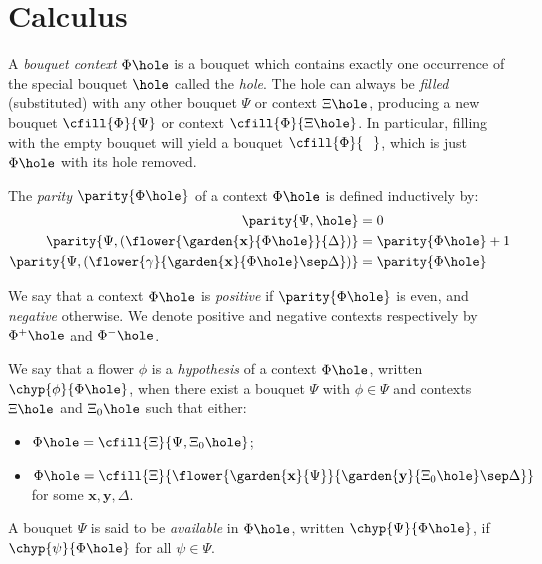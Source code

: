 \section{Calculus}


\begin{definition}
  A \emph{bouquet context} $\Phi\hole$ is a bouquet which contains exactly one
  occurrence of the special bouquet $\hole$ called the \emph{hole}. The hole can
  always be \emph{filled} (substituted) with any other bouquet $\Psi$ or context
  $\Xi\hole$, producing a new bouquet $\cfill{\Phi}{\Psi}$ or context
  $\cfill{\Phi}{\Xi\hole}$. In particular, filling with the empty bouquet will
  yield a bouquet $\cfill{\Phi}{\phantom{\Phi}}$, which is just $\Phi\hole$ with
  its hole removed.
\end{definition}

\begin{definition}[Parity]
  The \emph{parity} $\parity{\Phi\hole}$ of a context $\Phi\hole$ is defined inductively by:
  \begin{align*}
    \parity{\Psi, \hole} &= 0 \\
    \parity{\Psi, (\flower{\garden{\mathbf{x}}{\Phi\hole}}{\Delta})} &= \parity{\Phi\hole} + 1 \\
    \parity{\Psi, (\flower{\gamma}{\garden{\mathbf{x}}{\Phi\hole} \sep \Delta})} &= \parity{\Phi\hole}
  \end{align*}
\end{definition}

\begin{definition}[Polarity]
  We say that a context $\Phi\hole$ is \emph{positive} if $\parity{\Phi\hole}$ is even, and
  \emph{negative} otherwise. We denote positive and negative contexts
  respectively by $\Phi^+\hole$ and $\Phi^-\hole$.
\end{definition}

\begin{definition}[Hypothesis]
  We say that a flower $\phi$ is a \emph{hypothesis} of a context $\Phi\hole$, written
  $\chyp{\phi}{\Phi\hole}$, when there exist a bouquet $\Psi$ with $\phi \in \Psi$ and
  contexts $\Xi\hole$ and $\Xi_0\hole$ such that either:
  \begin{itemize}
    \item $\Phi\hole = \cfill{\Xi}{\Psi, \Xi_0\hole}$;
    \item $\Phi\hole =
    \cfill{\Xi}{\flower{\garden{\mathbf{x}}{\Psi}}{\garden{\mathbf{y}}{\Xi_0\hole}
    \sep \Delta}}$ for some $\mathbf{x}, \mathbf{y}, \Delta$.
  \end{itemize}
  A bouquet $\Psi$ is said to be \emph{available} in $\Phi\hole$, written
  $\chyp{\Psi}{\Phi\hole}$, if $\chyp{\psi}{\Phi\hole}$ for all $\psi \in \Psi$.
\end{definition}

